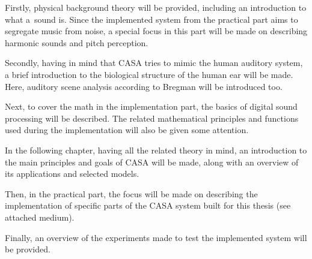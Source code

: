 \begin{description}
	\item Firstly, physical background theory will be provided, including an introduction to what a~sound is. Since the implemented system from the practical part aims to segregate music from noise, a special focus in this part will be made on describing harmonic sounds and pitch perception.

	\item Secondly, having in mind that CASA tries to mimic the human auditory system, a brief introduction to the biological structure of the human ear will be made. Here, auditory scene analysis according to Bregman will be introduced too.
	
	\item Next, to cover the math in the implementation part, the basics of digital sound processing will be described. The related mathematical principles and functions used during the implementation will also be given some attention.

	\item In the following chapter, having all the related theory in mind, an introduction to the main principles and goals of CASA will be made, along with an overview of its applications and selected models.

	\item Then, in the practical part, the focus will be made on describing the implementation of specific parts of the CASA system built for this thesis (see attached medium).

	\item Finally, an overview of the experiments made to test the implemented system will be provided.
\end{description}
